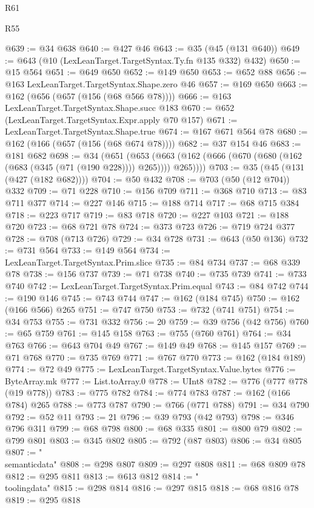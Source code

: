 \begin{lexlean}{R61}
\begin{lexlean}{R55}
\begin{coremodule}
{{{{{{{{{{{{{{{{{{{{{{{{{{{{{{{{{{{{{{{{{{{{{{{{{{{{{{{{{{{{{{@639 := @34 @638
@640 := @427 @46
@643 := @35 (@45 (@131 @640))
@649 := @643 (@10 (LexLeanTarget.TargetSyntax.Ty.fn @135 @332) @432)
@650 := @15 @564
@651 := @649 @650
@652 := @149 @650
@653 := @652 @88
@656 := @163 LexLeanTarget.TargetSyntax.Shape.zero @46
@657 := @169 @650
@663 := @162 (@656 (@657 (@156 (@68 @566 @78))))
@666 := @163 LexLeanTarget.TargetSyntax.Shape.succ @183
@670 := @652 (LexLeanTarget.TargetSyntax.Expr.apply @70 @157)
@671 := LexLeanTarget.TargetSyntax.Shape.true
@674 := @167 @671 @564 @78
@680 := @162 (@166 (@657 (@156 (@68 @674 @78))))
@682 := @37 @154 @46
@683 := @181 @682
@698 := @34
    (@651
      (@653 (@663 (@162 (@666 (@670 (@680 (@162 (@683 (@345 (@71 (@190 @228)))) @265)))) @265))))
@703 := @35 (@45 (@131 (@427 (@182 @682))))
@704 := @50 @432
@708 := @703 (@50 (@12 @704)) @332
@709 := @71 @228
@710 := @156 @709
@711 := @368 @710
@713 := @83 @711 @377
@714 := @227 @146
@715 := @188 @714
@717 := @68 @715 @384
@718 := @223 @717
@719 := @83 @718
@720 := @227 @103
@721 := @188 @720
@723 := @68 @721 @78
@724 := @373 @723
@726 := @719 @724 @377
@728 := @708 (@713 @726)
@729 := @34 @728
@731 := @643 (@50 @136)
@732 := @731 @564
@733 := @149 @564
@734 := LexLeanTarget.TargetSyntax.Prim.slice
@735 := @84 @734
@737 := @68 @339 @78
@738 := @156 @737
@739 := @71 @738
@740 := @735 @739
@741 := @733 @740
@742 := LexLeanTarget.TargetSyntax.Prim.equal
@743 := @84 @742
@744 := @190 @146
@745 := @743 @744
@747 := @162 (@184 @745)
@750 := @162 (@166 @566) @265
@751 := @747 @750
@753 := @732 (@741 @751)
@754 := @34 @753
@755 := @731 @332
@756 := 20
@759 := @39 @756 (@42 @756)
@760 := @65 @759
@761 := @145 @158
@763 := @755 (@760 @761)
@764 := @34 @763
@766 := @643 @704 @49
@767 := @149 @49
@768 := @145 @157
@769 := @71 @768
@770 := @735 @769
@771 := @767 @770
@773 := @162 (@184 @189)
@774 := @72 @49
@775 := LexLeanTarget.TargetSyntax.Value.bytes
@776 := ByteArray.mk
@777 := List.toArray.{0}
@778 := UInt8
@782 := @776 (@777 @778 (@19 @778))
@783 := @775 @782
@784 := @774 @783
@787 := @162 (@166 @784) @265
@788 := @773 @787
@790 := @766 (@771 @788)
@791 := @34 @790
@792 := @52 @11
@793 := 21
@796 := @39 @793 (@42 @793)
@798 := @346 @796 @311
@799 := @68 @798
@800 := @68 @335
@801 := @800 @79
@802 := @799 @801
@803 := @345 @802
@805 := @792 (@87 @803)
@806 := @34 @805
@807 := "\\semanticdata"
@808 := @298 @807
@809 := @297 @808
@811 := @68 @809 @78
@812 := @295 @811
@813 := @613 @812
@814 := "\\toolingdata"
@815 := @298 @814
@816 := @297 @815
@818 := @68 @816 @78
@819 := @295 @818
}}}}}}}}}}}}}}}}}}}}}}}}}}}}}}}}}}}}}}}}}}}}}}}}}}}}}}}}}}}}}}
\end{coremodule}
\end{lexlean}
\end{lexlean}
